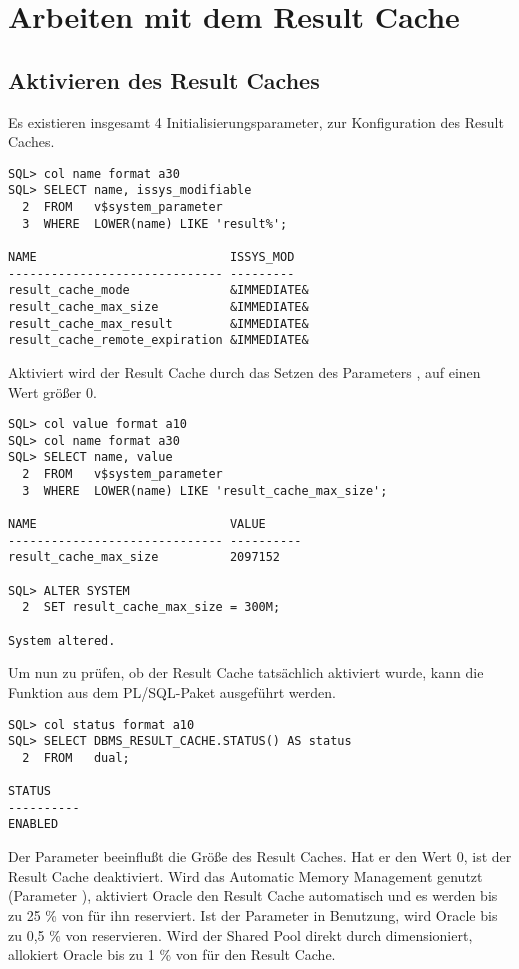     \section{Arbeiten mit dem Result Cache}
      \subsection{Aktivieren des Result Caches}
        Es existieren insgesamt 4 Initialisierungsparameter, zur
        Konfiguration des Result Caches.
        \begin{lstlisting}[caption={Die Result Cache Parameter},label=admin700,language=oracle_sql,alsolanguage=sqlplus]
SQL> col name format a30 
SQL> SELECT name, issys_modifiable
  2  FROM   v$system_parameter
  3  WHERE  LOWER(name) LIKE 'result%';

NAME                           ISSYS_MOD
------------------------------ ---------
result_cache_mode              &IMMEDIATE&
result_cache_max_size          &IMMEDIATE&
result_cache_max_result        &IMMEDIATE&
result_cache_remote_expiration &IMMEDIATE&
        \end{lstlisting}
        Aktiviert wird der Result Cache durch das Setzen des Parameters , auf einen Wert größer 0.
        \begin{lstlisting}[caption={Den Result Cache aktivieren},label=admin701,language=oracle_sql,alsolanguage=sqlplus]
SQL> col value format a10
SQL> col name format a30
SQL> SELECT name, value
  2  FROM   v$system_parameter
  3  WHERE  LOWER(name) LIKE 'result_cache_max_size';

NAME                           VALUE
------------------------------ ----------
result_cache_max_size          2097152

SQL> ALTER SYSTEM
  2  SET result_cache_max_size = 300M;

System altered.
        \end{lstlisting}
\clearpage
        Um nun zu prüfen, ob der Result Cache tatsächlich aktiviert wurde, kann die Funktion  aus dem PL/SQL-Paket  ausgeführt werden.

        \begin{lstlisting}[caption={Welchen Status hat der Result Cache?},label=admin702,language=oracle_sql,alsolanguage=sqlplus]
SQL> col status format a10
SQL> SELECT DBMS_RESULT_CACHE.STATUS() AS status
  2  FROM   dual;

STATUS
----------
ENABLED
        \end{lstlisting}
        Der  Parameter beeinflußt die Größe des Result Caches. Hat er den Wert 0, ist der Result Cache deaktiviert. Wird das Automatic Memory Management genutzt (Parameter ), aktiviert Oracle den Result Cache automatisch und es werden bis zu 25 \% von  für ihn reserviert. Ist der Parameter  in Benutzung, wird Oracle bis zu 0,5 \% von  reservieren. Wird der Shared Pool direkt durch  dimensioniert, allokiert Oracle bis zu 1 \% von  für den Result Cache.

